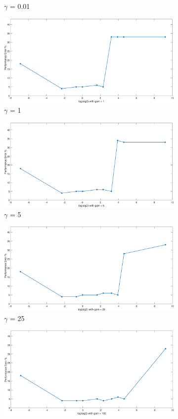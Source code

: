 \documentclass[12pt]{report}
\begin{document}
{\begin{figure}[!htbp]
\begin{floatrow}
{\begin{subfigure}{.3\textwidth}
				\caption{$\gamma$ = 0.01}
				\label{fig:loo_gamma(0.01)}
			\end{subfigure}%
			\begin{subfigure}{.3\textwidth}
				\includegraphics[height=0.35\linewidth,width=0.7\linewidth]{Ex1.3_loo_gam(1).eps}
				\caption{$\gamma$ = 1}
				\label{fig:loo_gamma(1))}
			\end{subfigure}
			\begin{subfigure}{.3\textwidth}
				\includegraphics[height=0.35\linewidth,width=0.7\linewidth]{Ex1.3_loo_gam(5).eps}
				\caption{$\gamma$ = 5}
				\label{fig:loo_gamma(5)}
			\end{subfigure}%
			\begin{subfigure}{.3\textwidth}
				\includegraphics[height=0.35\linewidth,width=0.7\linewidth]{Ex1.3_loo_gam(25).eps}
				\caption{$\gamma$ = 25}
				\label{fig:loo_gamma(25)}
			\end{subfigure}
			\begin{subfigure}{.3\textwidth}
				\includegraphics[height=0.35\linewidth,width=0.7\linewidth]{Ex1.3_loo_gam(100).eps}

\end{subfigure}}
\end{floatrow}
\end{figure}}
\end{document}
